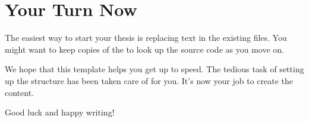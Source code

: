 \section{Your Turn Now}

The easiest way to start your thesis is replacing text in the existing files. You might want to keep copies of the  to look up the source code as you move on.

We hope that this template helps you get up to speed. The tedious task of setting up the structure has been taken care of for you. It's now your job to create the content.

Good luck and happy writing!

